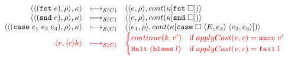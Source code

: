 \documentclass[acmsmall,review,anonymous]{acmart}\settopmatter{printfolios=true,printccs=false,printacmref=false}
\newcommand{\sOOinspect}[3]{\langle\langle#1,#2\rangle,#3\rangle}
\newcommand{\sOOreturn}[2]{\langle#1,#2\rangle}
\newcommand{\sOOhalt}[1]{\mathtt{Halt} \; #1}
\newcommand{\POOfun}[2]{#1 \shortrightarrow #2}
\newcommand{\POOprod}[2]{#1 \times #2}
\newcommand{\eOOlam}[4]{\lambda^{#1\rightarrow{}#2}#3.#4}
\newcommand{\eOOcons}[2]{\mathtt{cons} \; #1 \; #2}
\newcommand{\eOOcar}[1]{\mathtt{fst} \; #1}
\newcommand{\eOOcdr}[1]{\mathtt{snd} \; #1}
\newcommand{\eOOcase}[3]{\mathtt{case} \; #1 \; #2 \; #3}
\newcommand{\eOOcast}[4]{#1 \langle \cOOcast{#2}{#3}{#4} \rangle}
\newcommand{\cOOcast}[3]{#1 \Rightarrow^{#2} #3}
\newcommand{\oOOblame}[1]{\mathtt{blame} \; #1}
\newcommand{\rOOsucc}[1]{\mathtt{succ}\;#1}
\newcommand{\rOOfail}[1]{\mathtt{fail}\;#1}
\newcommand{\kOOconsI}[3]{#3[\mathtt{cons} \; \square \; \langle#1,#2\rangle ]}
\newcommand{\kOOconsII}[2]{#2[\mathtt{cons} \; #1 \; \square]}
\newcommand{\kOOinl}[1]{#1[\mathtt{inl} \; \square]}
\newcommand{\kOOinr}[1]{#1[\mathtt{inr} \; \square]}
\newcommand{\kOOappI}[3]{
	#3[\square \; \langle#1,#2\rangle ]
}
\newcommand{\kOOappII}[2]{
	#2[#1 \; \square]}
\newcommand{\kOOcar}[1]{#1[\mathtt{fst} \; \square]}
\newcommand{\kOOcdr}[1]{#1[\mathtt{snd} \; \square]}
\newcommand{\kOOcaseI}[4]{
	#4[\mathtt{case} \; \square \; \langle#1,#3\rangle \; \langle#2,#3\rangle ]}
\newcommand{\hcvOOfun}[5]{\mathtt{fun}^{\POOfun{#1}{#5}} \; #2 \; #3 \; #4}
\newcommand{\hcvOOcons}[4]{\mathtt{cons}^{\POOprod{#2}{#4}}\;#1\;#3}
\newcommand{\hcvOOinl}[2]{\mathtt{inl}^{#2}\;#1}
\newcommand{\hcvOOinr}[2]{\mathtt{inr}^{#2}\;#1}
\newcommand{\hckOOconsI}[3]{\mathtt{cons_1}\;#1\;#2\;#3}
\newcommand{\hckOOappII}[2]{\mathtt{app_2}\;#1\;#2}
\newcommand{\sidecond}[1]{\text{if}\;#1}
\newcommand{\redrule}[3]{#1 & \longmapsto_\mathcal{C} & #2 & #3\\}
\newcommand{\redruleS}[3]{#1 & \longmapsto_{\mathcal{S}(C)} & #2 & #3\\}
\newcommand{\hiredruleS}[3]{\highlight{#1} & 
\highlight{\longmapsto_{\mathcal{S}(C)}} & \highlight{#2} & \highlight{#3} \\}
\newcommand{\highlight}[1]{{\color{red} #1}}
\begin{document}
\begin{figure}
\[\begin{array}{rclr}
	\redruleS{
		\sOOinspect{(\eOOcar{e})}{\rho}{\kappa}}{
		\sOOinspect{e}{\rho}{cont(\kOOcar{\kappa})}}{}
	
	\redruleS{
		\sOOinspect{(\eOOcdr{e})}{\rho}{\kappa}}{
		\sOOinspect{e}{\rho}{cont(\kOOcdr{\kappa})}}{}
	
	\redruleS{
		\sOOinspect{(\eOOcase{e_1}{e_2}{e_3})}{\rho}{\kappa}}{
		\sOOinspect{e_1}{\rho}{cont(\kOOcaseI{E}{e_2}{e_3}{\kappa})}}{}
	\hiredruleS{
		\sOOreturn{v}{\langle c \rangle k}
	}{
	\begin{cases}
	continue(k,v') & \sidecond{applyCast(v,c) = \rOOsucc{v'}} 
	\\
	\sOOhalt{(\oOOblame{l})} & \sidecond{applyCast(v,c) = \rOOfail{l}}
	\end{cases}
	}{}
%
%
%
%
%
%	
%		
%		
	\end{array}
	\]
	

\end{figure}
\end{document}
